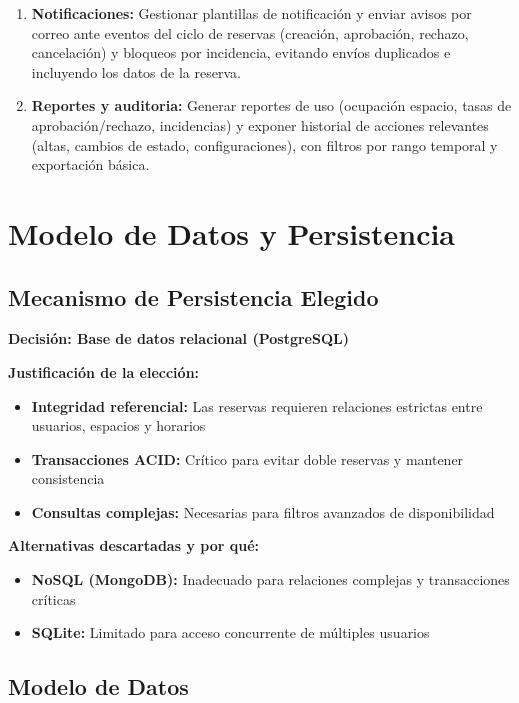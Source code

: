 \documentclass[a4paper, titlepage, 12pt]{article}
\begin{document}
\begin{enumerate}
    \item \textbf{Notificaciones:} Gestionar plantillas de notificación y enviar avisos por correo ante eventos del ciclo de reservas (creación, aprobación, rechazo, cancelación) y bloqueos por incidencia, evitando envíos duplicados e incluyendo los datos de la reserva.
    
    \item \textbf{Reportes y auditoria:} Generar reportes de uso (ocupación espacio, tasas de aprobación/rechazo, incidencias) y exponer historial de acciones relevantes (altas, cambios de estado, configuraciones), con filtros por rango temporal y exportación básica.
\end{enumerate}

\section{Modelo de Datos y Persistencia}

\subsection{Mecanismo de Persistencia Elegido}
\textbf{Decisión: Base de datos relacional (PostgreSQL)}

\textbf{Justificación de la elección:}
\begin{itemize}
    \item \textbf{Integridad referencial:} Las reservas requieren relaciones estrictas entre usuarios, espacios y horarios
    \item \textbf{Transacciones ACID:} Crítico para evitar doble reservas y mantener consistencia
    \item \textbf{Consultas complejas:} Necesarias para filtros avanzados de disponibilidad
\end{itemize}

\textbf{Alternativas descartadas y por qué:}
\begin{itemize}
    \item \textbf{NoSQL (MongoDB):} Inadecuado para relaciones complejas y transacciones críticas
    \item \textbf{SQLite:} Limitado para acceso concurrente de múltiples usuarios
\end{itemize}

\subsection{Modelo de Datos}
\end{document}
